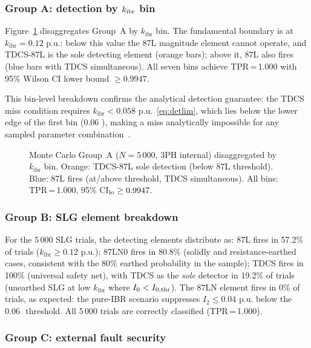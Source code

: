 \documentclass[journal,twoside,10pt]{IEEEtran}
\newcommand{\kibr}{k_{\mathrm{ibr}}}
\newcommand{\pu}{\,\text{p.u.}}
\begin{document}
\subsubsection{Group A: detection by $k_{\rm ibr}$ bin}

Figure~\ref{fig:mc} disaggregates Group~A by $\kibr$ bin.  The
fundamental boundary is at $\kibr = 0.12\,\pu$: below this value the
87L magnitude element cannot operate, and TDCS-87L is the sole detecting
element (orange bars); above it, 87L also fires (blue bars with TDCS
simultaneous).  All seven bins achieve TPR\,=\,1.000 with 95\% Wilson CI
lower bound $\geq 0.9947$.

This bin-level breakdown confirms the analytical detection guarantee: the
TDCS miss condition requires $\kibr < 0.058\,\pu$~\eqref{eq:detlim},
which lies below the lower edge of the first bin (0.06\,\pu), making a
miss analytically impossible for any sampled parameter
combination~\cite{SAMBP_TR26}.

\begin{figure}[!t]
  \centering
  
  \caption{Monte Carlo Group~A ($N=5\,000$, 3PH internal) disaggregated
           by $\kibr$ bin.  Orange: TDCS-87L sole detection (below 87L
           threshold).  Blue: 87L fires (at/above threshold, TDCS
           simultaneous).  All bins: TPR\,=\,1.000,
           95\% CI$_{\rm lo} \geq 0.9947$.}
  \label{fig:mc}
\end{figure}

\subsubsection{Group B: SLG element breakdown}

For the 5\,000 SLG trials, the detecting elements distribute as:
87L fires in 57.2\% of trials ($\kibr \geq 0.12\,\pu$);
87LN0 fires in 80.8\% (solidly and resistance-earthed cases,
consistent with the 80\% earthed probability in the sample);
TDCS fires in 100\% (universal safety net), with TDCS as the \emph{sole}
detector in 19.2\% of trials (unearthed SLG at low $\kibr$ where
$I_0 < I_{0,\rm thr}$).
The 87LN element fires in 0\% of trials, as expected: the
pure-IBR scenario suppresses $I_2 \leq 0.04\,\pu$ below the 0.06\,\pu
threshold.
All 5\,000 trials are correctly classified (TPR\,=\,1.000).

\subsubsection{Group C: external fault security}
\end{document}
